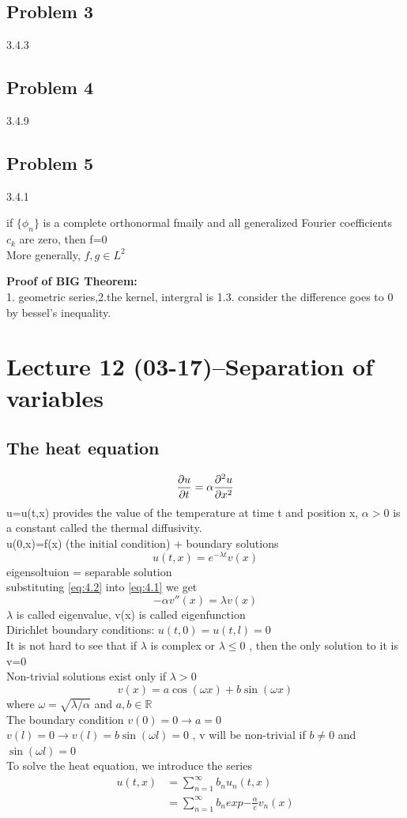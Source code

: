 \subsection*{Problem 3}
3.4.3
\subsection*{Problem 4}
3.4.9
\subsection*{Problem 5}
3.4.1
\begin{corollary}
    if $ \{\phi_n\} $ is a complete orthonormal fmaily and all generalized Fourier coefficients $ c_k $ are zero, then f=0
    \\More generally, $ f,g\in L^2 $  
\end{corollary}
\textbf{Proof of BIG Theorem:}
\\1. geometric series,2.the kernel, intergral is 1.3. consider the difference goes to 0 by bessel's inequality.
\section{Lecture 12 (03-17)--{Separation of variables}}
\subsection{The heat equation}
\begin{equation}
    \label{eq:4.1} \pdv{u}{t}=\alpha\pdv[2]{u}{x}
\end{equation}
u=u(t,x) provides the value of the temperature at time t and position x, $ \alpha>0 $ is a constant called the thermal diffusivity.
\\u(0,x)=f(x) (the initial condition) + boundary solutions
\begin{equation}
    \label{eq:4.2} u(t,x)=e^{-\lambda t}v(x)
\end{equation}
eigensoltuion = separable solution 
\\substituting \ref{eq:4.2} into \ref{eq:4.1} we get $$
    -\alpha v''(x)=\lambda v(x)
$$ $ \lambda $ is called eigenvalue, v(x) is called eigenfunction
\\Dirichlet boundary conditions: $ u(t,0)=u(t,l)=0 $    
\\It is not hard to see that if $ \lambda $ is complex or $ \lambda \leq0$ , then the only solution to it is v=0
\\Non-trivial solutions exist only if $ \lambda>0 $ $$
    v(x)=a\cos(\omega x)+b\sin(\omega x)
$$   where $ \omega=\sqrt{\lambda/\alpha} $ and $ a,b \in \mathbb{R} $ 
\\The boundary condition $ v(0)=0\rightarrow a=0 $
\\$ v(l)=0 \rightarrow v(l)=b\sin(\omega l)=0$ , v will be non-trivial if $ b\neq 0 $ and $ \sin(\omega l)=0 $
\\To solve the heat equation, we introduce the series\begin{align*}{}{}
u(t,x)&=\sum_{n=1}^{\infty}b_nu_n(t,x)\\
&=\sum_{n=1}^{\infty}b_nexp{-\frac{\alpha}{e}}v_n(x)
\end{align*}
